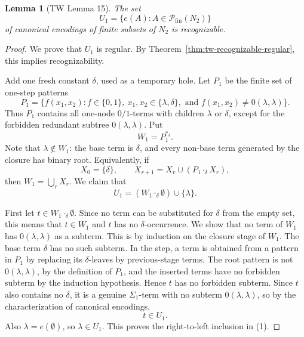 \documentclass[11pt]{article}
\newtheorem{lemma}[theorem]{Lemma}
\theoremstyle{definition}
\newcommand{\powfin}{\mathcal P_{\mathrm{fin}}}
\begin{document}
\begin{lemma}[TW Lemma 15]\label{lem:tw-encoding-one}
The set
\[
  U_1=\{e(A):A\in\powfin(N_2)\}
\]
of canonical encodings of finite subsets of \(N_2\) is recognizable.
\end{lemma}

\begin{proof}
We prove that \(U_1\) is regular.  By
Theorem~\ref{thm:tw-recognizable-regular}, this implies recognizability.

Add one fresh constant \(\delta\), used as a temporary hole.  Let \(P_1\) be the
finite set of one-step patterns
\[
  P_1=
  \{f(x_1,x_2):
      f\in\{0,1\},\ x_1,x_2\in\{\lambda,\delta\},
      \text{ and } f(x_1,x_2)\ne 0(\lambda,\lambda)\}.
\]
Thus \(P_1\) contains all one-node \(0/1\)-terms with children
\(\lambda\) or \(\delta\), except for the forbidden redundant subtree
\(0(\lambda,\lambda)\).  Put
\[
  W_1=P_1^{*_\delta}.
\]
Note that \(\lambda\notin W_1\): the base term is \(\delta\), and every
non-base term generated by the closure has binary root.
Equivalently, if
\[
  X_0=\{\delta\},\qquad
  X_{r+1}=X_r\cup(P_1\cdot_\delta X_r),
\]
then \(W_1=\bigcup_r X_r\).  We claim that
\[
  U_1=(W_1\cdot_\delta\emptyset)\cup\{\lambda\}.        \tag{1}
\]

First let \(t\in W_1\cdot_\delta\emptyset\).  Since no term can be substituted
for \(\delta\) from the empty set, this means that \(t\in W_1\) and \(t\) has no
\(\delta\)-occurrence.  We show that no term of \(W_1\) has
\(0(\lambda,\lambda)\) as a subterm.  This is by induction on the closure stage
of \(W_1\).  The base term \(\delta\) has no such subterm.  In the step, a term
is obtained from a pattern in \(P_1\) by replacing its \(\delta\)-leaves by
previous-stage terms.  The root pattern is not \(0(\lambda,\lambda)\), by the
definition of \(P_1\), and the inserted terms have no forbidden subterm by the
induction hypothesis.  Hence \(t\) has no forbidden subterm.  Since \(t\) also
contains no \(\delta\), it is a genuine \(\Sigma_1\)-term with no subterm
\(0(\lambda,\lambda)\), so by the characterization of canonical encodings,
\[
  t\in U_1.
\]
Also \(\lambda=e(\emptyset)\), so \(\lambda\in U_1\).  This proves the
right-to-left inclusion in (1).


\end{proof}
\end{document}
